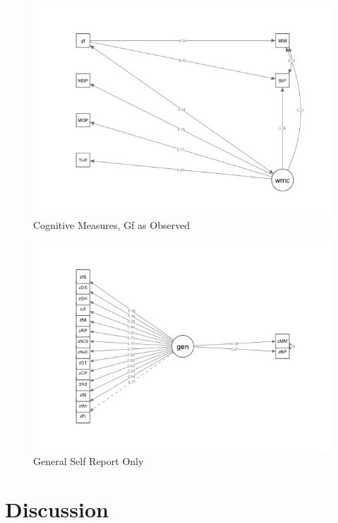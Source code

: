 \documentclass[12pt,]{book}
\begin{document}
\begin{figure}

{\centering \includegraphics[width=1\linewidth]{img/sem4} 

}

\caption{Cognitive Measures, Gf as Observed}\label{fig:model4}
\end{figure}

\begin{figure}

{\centering \includegraphics[width=1\linewidth]{img/sem5} 

}

\caption{General Self Report Only}\label{fig:model5}
\end{figure}

\hypertarget{discussion}{%
\section{Discussion}\label{discussion}}
\end{document}
